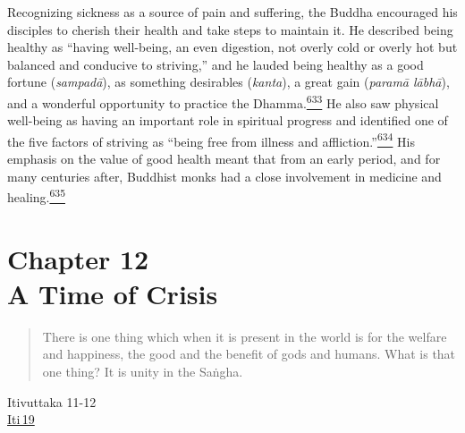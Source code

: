 Recognizing sickness as a source of pain and suffering, the Buddha
encouraged his disciples to cherish their health and take steps to
maintain it. He described being healthy as ``having well-being, an even
digestion, not overly cold or overly hot but balanced and conducive to
striving,'' and he lauded being healthy as a good fortune
(\emph{sampadā}), as something desirables (\emph{kanta}), a great gain
(\emph{paramā lābhā}), and a wonderful opportunity to practice the
Dhamma.\label{footprints_split_015.html_fnref633}\hyperref[footprints_split_025.htmlux5cux23fn633]{\textsuperscript{633}}
He also saw physical well-being as having an important role in spiritual
progress and identified one of the five factors of striving as ``being
free from illness and
affliction.''\label{footprints_split_015.html_fnref634}\hyperref[footprints_split_025.htmlux5cux23fn634]{\textsuperscript{634}}
His emphasis on the value of good health meant that from an early
period, and for many centuries after, Buddhist monks had a close
involvement in medicine and
healing.\label{footprints_split_015.html_fnref635}\hyperref[footprints_split_025.htmlux5cux23fn635]{\textsuperscript{635}}

\label{footprints_split_015.html_calibre_pb_31}

\label{footprints_split_016.html}{}

\section{\texorpdfstring{{Chapter 12}\\
A Time of
Crisis}{Chapter 12 A Time of Crisis}}\label{footprints_split_016.html_TOCTarget12}

\begin{quote}
There is one thing which when it is present in the world is for the
welfare and happiness, the good and the benefit of gods and humans. What
is that one thing? It is unity in the Saṅgha.
\end{quote}

Itivuttaka 11-12\\
\href{https://suttacentral.net/iti19/en/sujato}{Iti\,19}

